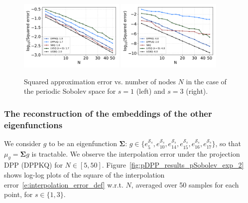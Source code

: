\documentclass[twoside,11pt]{book}
\numberwithin{theorem}{chapter}
\numberwithin{definition}{chapter}
\numberwithin{proposition}{chapter}
\numberwithin{corollary}{chapter}
\numberwithin{example}{chapter}
\numberwithin{lemma}{chapter}
\numberwithin{assumption}{chapter}
\numberwithin{equation}{chapter}
\numberwithin{figure}{chapter}
\begin{document}
\begin{figure}
\centering
\includegraphics[width=0.45\textwidth]{img/neurips/Sobolev/Sobolev_kernel_order_1_fig_1.pdf}
\includegraphics[width=0.45\textwidth]{img/neurips/Sobolev/Sobolev_kernel_order_3_fig_1.pdf}\\
\caption{Squared approximation error vs. number of nodes $N$ in the case of the periodic Sobolev space for $s = 1$ (left) and $s=3$ (right).
\label{fig:pDPP_results_pSobolev_exp_1}}
\end{figure}


\subsubsection{The reconstruction of the embeddings of the other eigenfunctions}
We consider $g$ to be an eigenfunction $\bm{\Sigma}$: $g \in \{e_{5}^{\mathcal{S}_{s}},e_{10}^{\mathcal{S}_{s}},e_{14}^{\mathcal{S}_{s}},e_{15}^{\mathcal{S}_{s}},e_{16}^{\mathcal{S}_{s}},e_{17}^{\mathcal{S}_{s}}\}$, so that $\mu_{g} = \bm{\Sigma}g$ is tractable. We observe the interpolation error under the projection DPP (DPPKQ) for $N \in [5,50]$. Figure~\ref{fig:pDPP_results_pSobolev_exp_2} shows log-log plots of the square of the interpolation error~\eqref{e:interpolation_error_def} w.r.t. $N$, averaged over 50 samples for each point, for $s \in \{1,3\}$.
\end{document}
